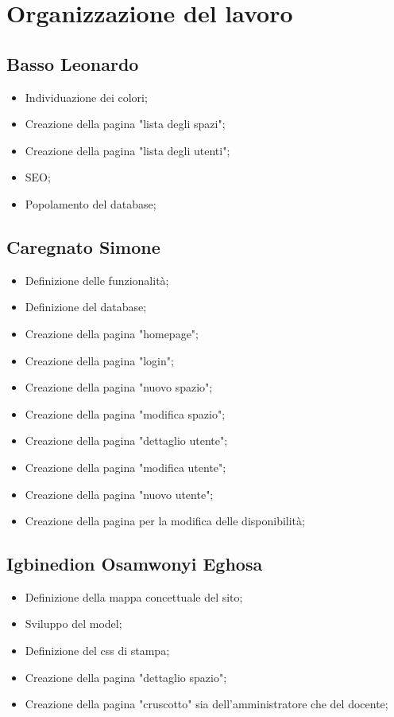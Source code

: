 \section{Organizzazione del lavoro}

\subsection{Basso Leonardo}
\begin{itemize}
	\item Individuazione dei colori;
	\item Creazione della pagina "lista degli spazi";
	\item Creazione della pagina "lista degli utenti";
	\item SEO;
	\item Popolamento del database;
\end{itemize}

\subsection{Caregnato Simone}
\begin{itemize}
	\item Definizione delle funzionalità;
	\item Definizione del database;
	\item Creazione della pagina "homepage";
	\item Creazione della pagina "login";
	\item Creazione della pagina "nuovo spazio";
	\item Creazione della pagina "modifica spazio";
	\item Creazione della pagina "dettaglio utente";
	\item Creazione della pagina "modifica utente";
	\item Creazione della pagina "nuovo utente";
	\item Creazione della pagina per la modifica delle disponibilità;
\end{itemize}

\subsection{Igbinedion Osamwonyi Eghosa}
\begin{itemize}
	\item Definizione della mappa concettuale del sito;
	\item Sviluppo del model;
	\item Definizione del css di stampa;
	\item Creazione della pagina "dettaglio spazio";
	\item Creazione della pagina "cruscotto" sia dell'amministratore che
	      del docente;
\end{itemize}

